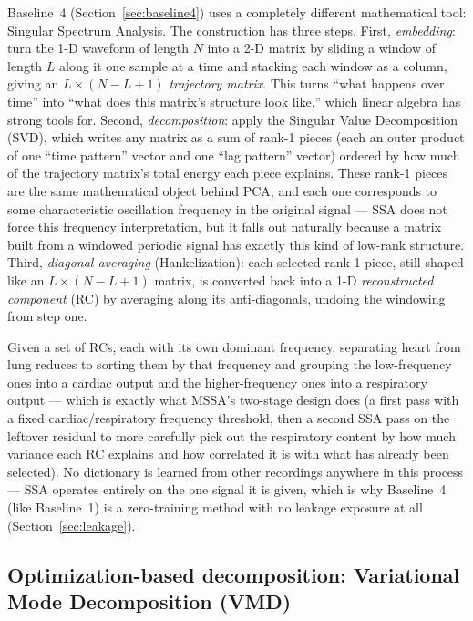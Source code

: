 \documentclass[11pt]{article}
\begin{document}
Baseline~4 (Section~\ref{sec:baseline4}) uses a completely different
mathematical tool: Singular Spectrum Analysis. The construction has three
steps. First, \emph{embedding}: turn the 1-D waveform of length $N$ into a
2-D matrix by sliding a window of length $L$ along it one sample at a time
and stacking each window as a column, giving an $L\times(N-L+1)$
\emph{trajectory matrix}. This turns ``what happens over time'' into ``what
does this matrix's structure look like,'' which linear algebra has strong
tools for. Second, \emph{decomposition}: apply the Singular Value
Decomposition (SVD), which writes any matrix as a sum of rank-1 pieces
(each an outer product of one ``time pattern'' vector and one ``lag
pattern'' vector) ordered by how much of the trajectory matrix's total
energy each piece explains. These rank-1 pieces are the same mathematical
object behind PCA, and each one corresponds to some characteristic
oscillation frequency in the original signal --- SSA does not force this
frequency interpretation, but it falls out naturally because a matrix
built from a windowed periodic signal has exactly this kind of low-rank
structure. Third, \emph{diagonal averaging} (Hankelization): each selected
rank-1 piece, still shaped like an $L\times(N-L+1)$ matrix, is converted
back into a 1-D \emph{reconstructed component} (RC) by averaging along its
anti-diagonals, undoing the windowing from step one.

Given a set of RCs, each with its own dominant frequency, separating heart
from lung reduces to sorting them by that frequency and grouping the
low-frequency ones into a cardiac output and the higher-frequency ones into
a respiratory output --- which is exactly what MSSA's two-stage design does
(a first pass with a fixed cardiac/respiratory frequency threshold, then a
second SSA pass on the leftover residual to more carefully pick out the
respiratory content by how much variance each RC explains and how
correlated it is with what has already been selected). No dictionary is
learned from other recordings anywhere in this process --- SSA operates
entirely on the one signal it is given, which is why Baseline~4 (like
Baseline~1) is a zero-training method with no leakage exposure at all
(Section~\ref{sec:leakage}).

\subsection{Optimization-based decomposition: Variational Mode Decomposition (VMD)}
\label{sec:bg-vmd}
\end{document}

